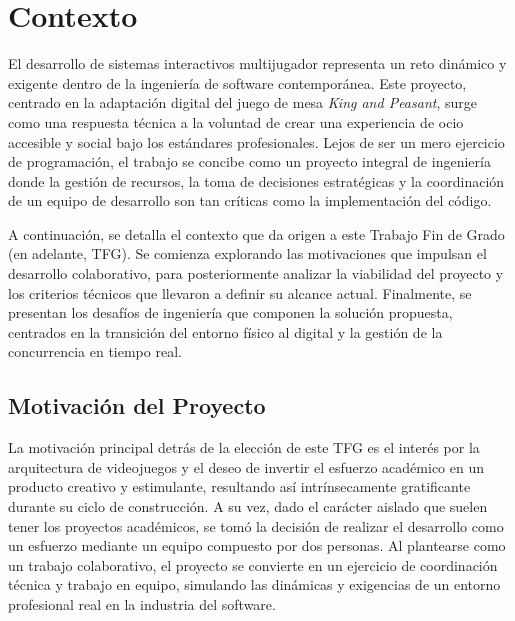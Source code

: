 \chapter{Contexto}

\begin{abstract}
El siguiente capítulo aborda la concepción y el marco operativo del proyecto \textit{King and Peasant}. Se expone la motivación inicial centrada en el desarrollo colaborativo y el interés por la arquitectura de videojuegos. Asimismo, se justifica la acotación del alcance del trabajo basada en un análisis de viabilidad técnica y temporal, fundamentando la decisión de adaptar un juego de mesa preexistente mediante tecnologías web modernas. Por último, se detallan los principales desafíos de ingeniería identificados, estableciendo la base para los objetivos y el desarrollo técnico que se describen en los capítulos posteriores.
\end{abstract}

El desarrollo de sistemas interactivos multijugador representa un reto dinámico y exigente dentro de la ingeniería de software contemporánea. Este proyecto, centrado en la adaptación digital del juego de mesa \textit{King and Peasant}, surge como una respuesta técnica a la voluntad de crear una experiencia de ocio accesible y social bajo los estándares profesionales. Lejos de ser un mero ejercicio de programación, el trabajo se concibe como un proyecto integral de ingeniería donde la gestión de recursos, la toma de decisiones estratégicas y la coordinación de un equipo de desarrollo son tan críticas como la implementación del código.

A continuación, se detalla el contexto que da origen a este Trabajo Fin de Grado (en adelante, TFG). Se comienza explorando las motivaciones que impulsan el desarrollo colaborativo, para posteriormente analizar la viabilidad del proyecto y los criterios técnicos que llevaron a definir su alcance actual. Finalmente, se presentan los desafíos de ingeniería que componen la solución propuesta, centrados en la transición del entorno físico al digital y la gestión de la concurrencia en tiempo real.

\section{Motivación del Proyecto}

La motivación principal detrás de la elección de este TFG es el interés por la arquitectura de videojuegos y el deseo de invertir el esfuerzo académico en un producto creativo y estimulante, resultando así intrínsecamente gratificante durante su ciclo de construcción. A su vez, dado el carácter aislado que suelen tener los proyectos académicos, se tomó la decisión de realizar el desarrollo como un esfuerzo mediante un equipo compuesto por dos personas. Al plantearse como un trabajo colaborativo, el proyecto se convierte en un ejercicio de coordinación técnica y trabajo en equipo, simulando las dinámicas y exigencias de un entorno profesional real en la industria del software.

